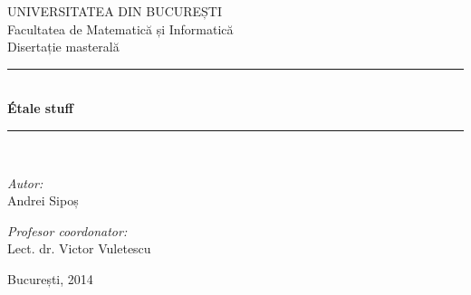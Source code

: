 \documentclass[13pt,openany]{book}
\begin{document}
\newtheorem{teo}{\bf Teorema}[chapter]
\newtheorem{cor}[teo]{\bf Corolarul}
\newtheorem{lema}[teo]{\bf Lema}
\newtheorem{prob}[teo]{\bf Problema}
\newtheorem{conj}[teo]{\bf Conjectura}
\newtheorem{propr}[teo]{\bf Proprietatea}
\newtheorem{prop}[teo]{\bf Propoziția}
\newtheorem{alg}[teo]{\bf Algoritmul}
\theoremstyle{remark}
\newtheorem{obs}[teo]{\bf Observația}
\newtheorem{obss}[teo]{\bf Observațiile}
\newtheorem{ex}[teo]{\bf Exemplul}
\newtheorem{exs}[teo]{\bf Exemplele}
\theoremstyle{definition}
\newtheorem{defi}[teo]{\bf Definiția}

\newcommand{\calm}{\mathcal{M}}
\newcommand{\Qell}{\mathbb{Q}_\ell}

\setcounter{page}{1}
\fontsize{3.9mm}{5mm}\selectfont
\pagestyle{empty}
\begin{center}

\LARGE UNIVERSITATEA DIN BUCUREȘTI\\[0.5cm]
\LARGE Facultatea de Matematică și Informatică\\[3cm]

\Large Disertație masterală\\[3.5cm] 
 
\rule{8cm}{0.5mm}\\[0.8cm]
{ \huge \bfseries Étale stuff}\\[0.2cm]
\rule{8cm}{0.5mm}\\[2.5cm]

\begin{minipage}{0.4\textwidth}
\begin{flushleft} \large
\emph{Autor:}\\
Andrei Sipoș
\end{flushleft}
\end{minipage}
\begin{minipage}{0.5\textwidth}
\begin{flushright} \large
\emph{Profesor coordonator:} \\
Lect. dr. Victor Vuletescu
\end{flushright}
\end{minipage}

\vfill

{\large București, 2014}

\end{center}
\newpage
\phantom{X}
\newpage

\tableofcontents

\newpage
\phantom{X}
\newpage

\setlength{\parskip}{1.5ex plus 0.5ex minus 0.2ex}
\end{document}
